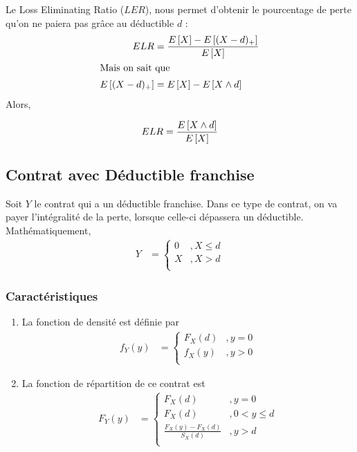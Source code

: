 \documentclass[12pt, french]{report}
\begin{document}
\begin{definition}
Le Loss Eliminating Ratio ($LER$), nous permet d'obtenir le pourcentage de perte qu'on ne paiera pas grâce au déductible $d$ : 
\begin{align*}
ELR 	& = \frac{E \left[ X \right] - E \left[ (X-d)_+ \right]}{E \left[ X \right]} \\
\shortintertext{Mais on sait que}
E \left[ (X-d)_+ \right]	& = E \left[ X \right] - E \left[ X \wedge d \right] \\
\end{align*}
Alors,

\begin{equation}
ELR  = \frac{E \left[ X \wedge d \right]}{E \left[ X \right]} 
\end{equation}
\end{definition}

\subsection{Contrat avec Déductible franchise}
Soit $Y$ le contrat qui a un déductible franchise. Dans ce type de contrat, on va payer l'intégralité de la perte, lorsque celle-ci dépassera un déductible. Mathématiquement,
\begin{align*}
Y	& = 
\begin{cases}
0	& , X \leq d \\
X	& , X > d \\
\end{cases}
\end{align*}

\subsubsection{Caractéristiques}
\begin{enumerate}[label=(\arabic*)]
\item La fonction de densité est définie par
\begin{align*}
f_Y(y)	& = 
\begin{cases}
F_X(d)	&, y = 0 \\
f_X(y)	&, y > 0 \\
\end{cases}
\end{align*}


\item La fonction de répartition de ce contrat est
\begin{align*}
F_Y(y)	& = 
\begin{cases}
F_X(d)	& , y = 0 \\
F_X(d)	& , 0 < y \leq d \\
\frac{F_X(y) - F_X(d)}{S_X(d)}	& , y > d \\
\end{cases}
\end{align*}
\end{enumerate}
\end{document}
